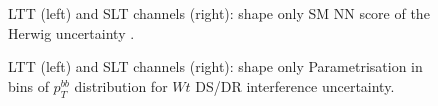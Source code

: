   \begin{figure}
    \centering
    \caption{LTT (left) and SLT channels (right): shape only SM NN score of the Herwig uncertainty .}
    \label{fig:singletopsyst_lephad_herwig_NN}
    \end{figure}


\begin{figure}
\centering
{}
\caption{LTT (left) and SLT channels (right): shape only Parametrisation in bins of $p_T^{bb}$ distribution for $Wt$ DS/DR interference uncertainty.}
\label{fig:singletopsyst_lephad_interference_pTBB}
\end{figure}

